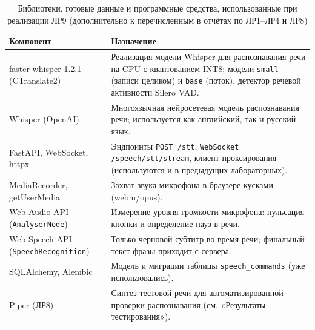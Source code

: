 \begin{table}[H]
  \centering
  \caption{Библиотеки, готовые данные и программные средства, использованные при реализации ЛР9 (дополнительно к перечисленным в отчётах по ЛР1--ЛР4 и ЛР8)}
  \label{tab:stack-stt}
  \small
  \begin{tabularx}{\textwidth}{|l|X|}
    \hline
    Компонент & Назначение \\
    \hline
    faster-whisper 1.2.1 (CTranslate2) & Реализация модели Whisper для
      распознавания речи на CPU с квантованием INT8; модели
      \texttt{small} (записи целиком) и \texttt{base} (поток),
      детектор речевой активности Silero VAD. \\
    \hline
    Whisper (OpenAI) & Многоязычная нейросетевая модель распознавания
      речи; используется как английский, так и русский язык. \\
    \hline
    FastAPI, WebSocket, httpx & Эндпоинты \texttt{POST /stt},
      \texttt{WebSocket /speech/stt/stream}, клиент проксирования
      (используются и в предыдущих лабораторных). \\
    \hline
    MediaRecorder, getUserMedia & Захват звука микрофона в браузере
      кусками (webm/opus). \\
    \hline
    Web Audio API (\texttt{AnalyserNode}) & Измерение уровня громкости
      микрофона: пульсация кнопки и определение пауз в речи. \\
    \hline
    Web Speech API (\texttt{SpeechRecognition}) & Только черновой
      субтитр во время речи; финальный текст фразы приходит с
      сервера. \\
    \hline
    SQLAlchemy, Alembic & Модель и миграции таблицы
      \texttt{speech\_commands} (уже использовались). \\
    \hline
    Piper (ЛР8) & Синтез тестовой речи для автоматизированной проверки
      распознавания (см. «Результаты тестирования»). \\
    \hline
  \end{tabularx}
\end{table}
